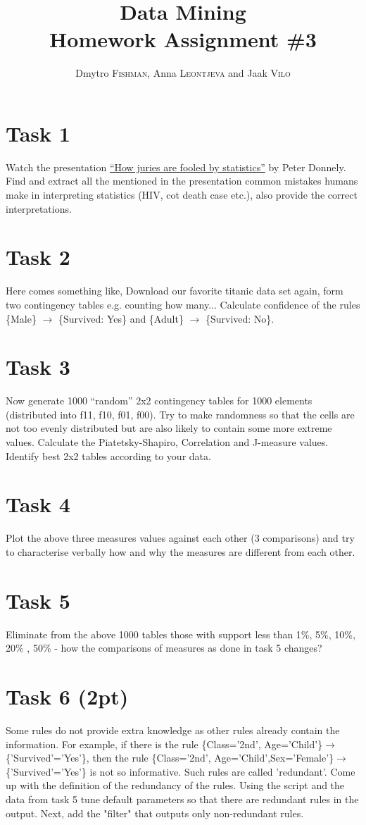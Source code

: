 \documentclass{article}
\title{Data Mining\\Homework Assignment \#3} %
\author{Dmytro \textsc{Fishman}, Anna \textsc{Leontjeva} and Jaak \textsc{Vilo}} %
\begin{document}
\maketitle %

\section*{Task 1}
Watch the presentation \href{http://www.ted.com/talks/peter_donnelly_shows_how_stats_fool_juries.html}{``How juries are fooled by statistics''} by Peter Donnely. Find and extract all the mentioned in the presentation common mistakes humans make in interpreting statistics (HIV, cot death case etc.), also provide the correct interpretations.
\section*{Task 2}
Here comes something like, Download our favorite titanic data set again, form two contingency tables e.g. counting how many... Calculate confidence of the rules \{Male\} $\rightarrow$ \{Survived: Yes\} and \{Adult\} $\rightarrow$ \{Survived: No\}.
\section*{Task 3}
Now generate 1000 ``random'' 2x2 contingency tables for 1000 elements (distributed into f11, f10, f01, f00). Try to make randomness so that the cells are not too evenly distributed but are also likely to contain some more extreme values. Calculate the Piatetsky-Shapiro, Correlation and J-measure values. Identify best 2x2 tables according to your data.

\section*{Task 4}
Plot the above three measures values against each other (3 comparisons) and try to characterise verbally how and why the measures are different from each other.
 
\section*{Task 5}
Eliminate from the above 1000 tables those with support less than 1\%, 5\%, 10\%, 20\% , 50\% - how the comparisons of measures as done in task 5 changes?

\section*{Task 6 (2pt)}
Some rules do not provide extra knowledge as other rules already  contain the information. For example, if there is the rule \{Class='2nd', Age='Child'\}$\rightarrow$\\\{'Survived'='Yes'\}, then the rule \{Class='2nd', Age='Child',Sex='Female'\}$\rightarrow$\\\{'Survived'='Yes'\} is not so informative. Such rules are called 'redundant'. Come up with the definition of the redundancy of the rules. Using the script and the data from task 5 tune default parameters so that there are redundant rules in the output. Next, add the "filter" that outputs only non-redundant rules. 
\end{document}
